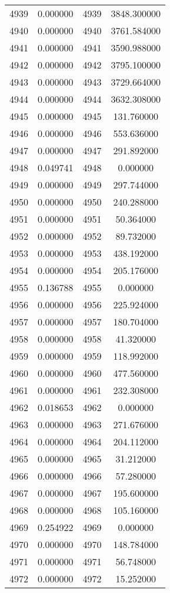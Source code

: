 \documentclass[12pt]{article}
\begin{document}
\begin{longtable}{@{}cccc@{}}
4939 & 0.000000 & 4939 & 3848.300000 \\
4940 & 0.000000 & 4940 & 3761.584000 \\
4941 & 0.000000 & 4941 & 3590.988000 \\
4942 & 0.000000 & 4942 & 3795.100000 \\
4943 & 0.000000 & 4943 & 3729.664000 \\
4944 & 0.000000 & 4944 & 3632.308000 \\
4945 & 0.000000 & 4945 & 131.760000 \\
4946 & 0.000000 & 4946 & 553.636000 \\
4947 & 0.000000 & 4947 & 291.892000 \\
4948 & 0.049741 & 4948 & 0.000000 \\
4949 & 0.000000 & 4949 & 297.744000 \\
4950 & 0.000000 & 4950 & 240.288000 \\
4951 & 0.000000 & 4951 & 50.364000 \\
4952 & 0.000000 & 4952 & 89.732000 \\
4953 & 0.000000 & 4953 & 438.192000 \\
4954 & 0.000000 & 4954 & 205.176000 \\
4955 & 0.136788 & 4955 & 0.000000 \\
4956 & 0.000000 & 4956 & 225.924000 \\
4957 & 0.000000 & 4957 & 180.704000 \\
4958 & 0.000000 & 4958 & 41.320000 \\
4959 & 0.000000 & 4959 & 118.992000 \\
4960 & 0.000000 & 4960 & 477.560000 \\
4961 & 0.000000 & 4961 & 232.308000 \\
4962 & 0.018653 & 4962 & 0.000000 \\
4963 & 0.000000 & 4963 & 271.676000 \\
4964 & 0.000000 & 4964 & 204.112000 \\
4965 & 0.000000 & 4965 & 31.212000 \\
4966 & 0.000000 & 4966 & 57.280000 \\
4967 & 0.000000 & 4967 & 195.600000 \\
4968 & 0.000000 & 4968 & 105.160000 \\
4969 & 0.254922 & 4969 & 0.000000 \\
4970 & 0.000000 & 4970 & 148.784000 \\
4971 & 0.000000 & 4971 & 56.748000 \\
4972 & 0.000000 & 4972 & 15.252000 \\

\end{longtable}
\end{document}
